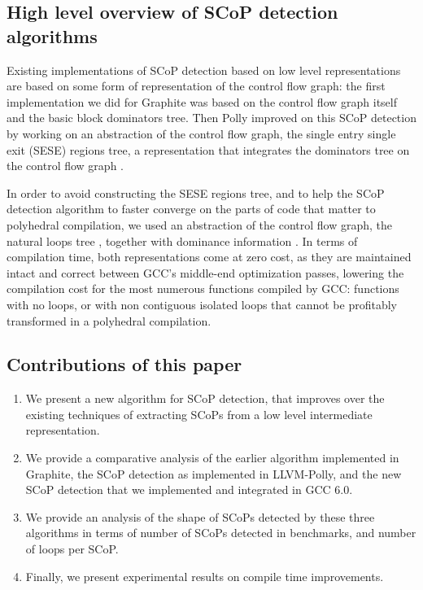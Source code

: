 \documentclass{sig-alternate}
\begin{document}
\subsection{High level overview of SCoP detection algorithms}

Existing implementations of SCoP detection based on low level representations
are based on some form of representation of the control flow graph: the first
implementation we did for Graphite \cite{graphite} was based on the control
flow graph itself and the basic block dominators tree.  Then Polly improved on
this SCoP detection \cite{polly} by working on an abstraction of the control flow graph, the
single entry single exit (SESE) regions tree, a representation that integrates
the dominators tree on the control flow graph \cite{sese}.

In order to avoid constructing the SESE regions tree, and to help the SCoP detection
algorithm to faster converge on the parts of code that matter to polyhedral
compilation, we used an abstraction of the control flow graph, the natural loops
tree \cite{dragonbook}, together with dominance information \cite{ramalingam}.
In terms of compilation time, both representations come at zero cost, as they
are maintained intact and correct between GCC's middle-end optimization passes,
lowering the compilation cost for the most numerous functions compiled by GCC:
functions with no loops, or with non contiguous isolated loops that cannot be
profitably transformed in a polyhedral compilation.

\subsection{Contributions of this paper}
\begin{enumerate}
  \item We present a new algorithm for SCoP detection, that improves over the
    existing techniques of extracting SCoPs from a low level intermediate
    representation.
  \item We provide a comparative analysis of the earlier algorithm implemented
    in Graphite, the SCoP detection as implemented in LLVM-Polly, and the new
    SCoP detection that we implemented and integrated in GCC 6.0.
  \item We provide an analysis of the shape of SCoPs detected by these three
    algorithms in terms of number of SCoPs detected in benchmarks, and number of
    loops per SCoP.
  \item Finally, we present experimental results on compile time improvements.
\end{enumerate}
\end{document}
